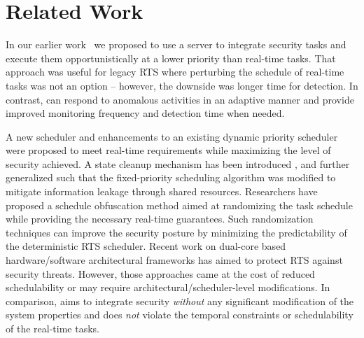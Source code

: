 \documentclass[../rt_server_main.tex]{subfiles}
\begin{document}
\section{Related Work}

In our earlier work~\cite{mhasan_rtss16} we proposed to use a server to 
integrate security tasks and execute them opportunistically at a lower priority than real-time tasks. That
approach was useful for legacy RTS
where perturbing 
the schedule of real-time tasks was not an option -- however, the downside was longer time for detection. In contrast, \coolname can respond to anomalous activities in an adaptive manner and provide improved monitoring frequency and detection time when needed. 

A new scheduler \cite{xie2007improving} and enhancements to an existing dynamic priority scheduler \cite{lin2009static} were proposed to meet real-time requirements while maximizing the level of security achieved.
A state cleanup mechanism has been introduced \cite{sg1}, and further generalized \cite{sg2, sibin_RT_security_journal} such that the fixed-priority
scheduling algorithm was modified to mitigate information leakage through shared resources. Researchers  have proposed a schedule obfuscation method \cite{taskshuffler} aimed at randomizing the task schedule while providing the necessary real-time guarantees. Such randomization techniques can improve the security posture by minimizing the predictability of the deterministic RTS scheduler. %
Recent work \cite{slack_cornell, securecore} on dual-core based hardware/software architectural frameworks has aimed to protect RTS against security threats. However, those approaches came at the cost of reduced schedulability or may require architectural/scheduler-level modifications. In comparison, \coolname aims to integrate security \textit{without} any significant modification of the system properties and does \textit{not} violate the temporal constraints or schedulability of the real-time tasks.



\end{document}
